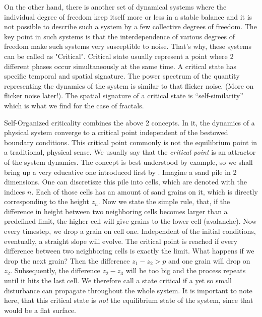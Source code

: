 \documentclass[11pt]{article}
\begin{document}
On the other hand, there is another set of dynamical systems where the individual degree of freedom keep itself more or less in a stable balance and it is not possible to describe such a system by a few collective degrees of freedom. The key point in such systems is that the interdependence of various degrees of freedom make such systems very susceptible to noise. That's why, these systems can be called as "Critical". Critical state usually represent a point where 2 different phases occur simultaneously at the same time. A critical state has specific temporal and spatial signature. The power spectrum of the quantity representing the dynamics of the system is similar to that flicker noise. (More on flicker noise later!). The spatial signature of a critical state is ``self-similarity'' which is what we find for the case of fractals.

Self-Organized criticality combines the above 2 concepts. In it, the dynamics of a physical system converge to a critical point independent of the bestowed boundary conditions. This critical point commonly is not the equilibrium point in a traditional, physical sense. We usually say that the \textit{critical point} is an attractor of the system dynamics. The concept is best understood by example, so we shall bring up a very educative one introduced first by \cite{ref3}. 
Imagine a sand pile in 2 dimensions. One can discretisze this pile into cells, which are denoted with the indices $n$. Each of those cells has an amount of sand grains on it, which is directly corresponding to the height $z_{n}$. Now we state the simple rule, that, if the difference in height between two neighboring cells becomes larger than a predefined limit, the higher cell will give grains to the lower cell (avalanche). Now every timestep, we drop a grain on cell one. Independent of the initial conditions, eventually, a straight slope will evolve. The critical point is reached if every difference between two neighboring cells is exactly the limit. What happens if we drop the next grain? Then the difference $z_{1}-z_{2}>p$ and one grain will drop on $z_{2}$. Subsequently, the difference $z_{2}-z_{3}$ will be too big and the process repeats until it hits the last cell. We therefore call a state critical if a yet so small disturbance can propagate throughout the whole system.
It is important to note here, that this critical state is \emph{not} the equilibrium state of the system, since that would be a flat surface. 
\end{document}
